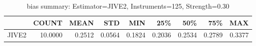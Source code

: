 \begin{table}[ht]
\centering
\caption{bias summary: Estimator=JIVE2, Instruments=125, Strength=0.30}
\begin{tabular}{lrrrrrrrr}
\toprule
 & COUNT & MEAN & STD & MIN & 25\% & 50\% & 75\% & MAX \\
\midrule
JIVE2 & 10.0000 & 0.2512 & 0.0564 & 0.1824 & 0.2036 & 0.2534 & 0.2789 & 0.3377 \\
\bottomrule
\end{tabular}
\end{table}

